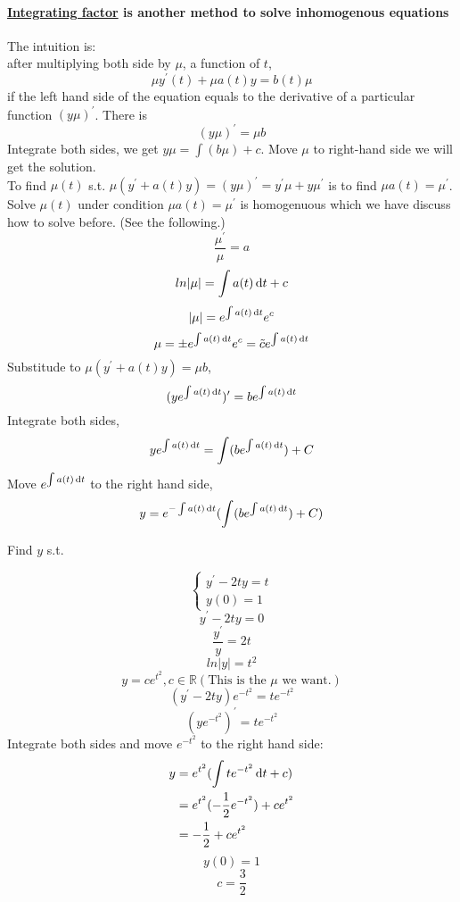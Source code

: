 \paragraph{\underline{Integrating factor} is another method to solve inhomogenous equations} The intuition is: \\after multiplying both side by $\mu$, a function of $t$, 
\[\mu y^{\prime}(t)+\mu a(t)y=b(t)\mu
\]
if the left hand side of the equation equals to the derivative of a particular function $(y\mu)^\prime$. There is
\[(y\mu)^{\prime}=\mu b
\]
Integrate both sides, we get $y\mu=\int(b\mu)+c$. Move $\mu$ to right-hand side we will get the solution.\\
To find $\mu(t)$ s.t. $\mu(y^{\prime}+a(t)y)=(y\mu)^{\prime}=y^{\prime}\mu+y\mu^{\prime}$ is to find $\mu a(t)=\mu^\prime$. \\
Solve $\mu(t)$ under condition $\mu a(t)=\mu^\prime$ is homogenuous which we have discuss how to solve before. (See the following.)
\[\frac{\mu^\prime}{\mu}=a\]
\[ln|\mu|=\int a(t)\,\mathrm{d} t+c\]
\[|\mu|=e^{\int a(t)\,\mathrm{d} t}e^c\]
\[\mu=\pm e^{\int a(t)\,\mathrm{d} t}e^c=\tilde{c}e^{\int a(t)\,\mathrm{d} t}\]
Substitude to $\mu(y^\prime+a(t)y)=\mu b$,
\[(ye^{\int a(t)\,\mathrm{d} t})^\prime=be^{\int a(t)\,\mathrm{d} t}
\]
Integrate both sides,
\[ye^{\int a(t)\,\mathrm{d} t}=\int(be^{\int a(t)\,\mathrm{d} t})+C\]
Move $e^{\int a(t)\,\mathrm{d} t}$ to the right hand side,
\[y=e^{-\int a(t)\,\mathrm{d} t}(\int(be^{\int a(t)\,\mathrm{d} t})+C)\]
\begin{example}
Find $y$ s.t.

\[
\left \{	\begin{gathered}
y^\prime-2ty=t 	\\
y(0)=1
\end{gathered}	\right.
\]
\[y^{\prime}-2ty=0\]
\[\frac{y^\prime}{y}=2t\]
\[ln|y|=t^2\]
\[y=ce^{t^2}, c\in\mathbb{R}  (\text{This is the $\mu$ we want.})\]
\[(y^\prime-2ty)e^{-t^2}=te^{-t^2}\]
\[(ye^{-t^2})^\prime=te^{-t^2}\]
Integrate both sides and move $e^{-t^2}$ to the right hand side:
\[
\begin{aligned}
	 y&=e^{t^2}(\int te^{-t^2}\,\mathrm{d} t+c)  \\
 		&=e^{t^2}(-\frac{1}{2}e^{-t^2})+ce^{t^2} \\
		&=-\frac{1}{2}+ce^{t^2} \\	
\end{aligned}
\]
\[y(0)=1\]
\[c=\frac{3}{2}\]
\end{example}






